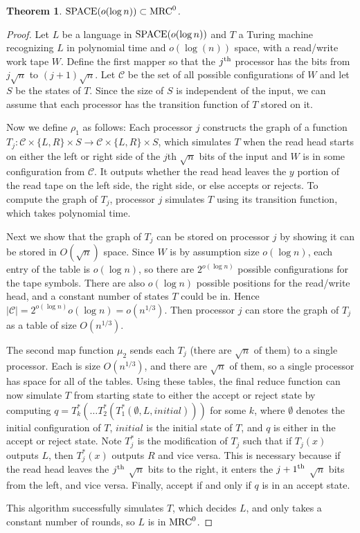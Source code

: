 \documentclass[11pt]{article}
\newtheorem{thm}{Theorem}
\theoremstyle{definition}
\theoremstyle{remark}
\newcommand{\mrc}{\textup{MRC}}
\begin{document}
\begin{thm} \label{thm:sublogspace}
$\textup{SPACE}(o(\log n))\subset \mrc^0$.
\end{thm}

\begin{proof}
Let $L$ be a language in $\textup{SPACE}(o(\log n))$ and $T$ a Turing machine
recognizing $L$ in polynomial time and $o(\log(n))$ space, with a read/write
work tape $W$.  Define the first mapper so that the $j^\textup{th}$ processor
has the bits from $j\sqrt{n}$ to $(j+1)\sqrt{n}$. Let $\mathcal{C}$ be the set
of all possible configurations of $W$ and let $S$ be the states of $T$.  Since
the size of $S$ is independent of the input, we can assume that each processor
has the transition function of $T$ stored on it.

Now we define $\rho_1$ as follows: Each processor $j$ constructs the graph of a
function $T_j:\mathcal{C} \times \{L,R\} \times S \rightarrow \mathcal{C}
\times \{L,R\} \times S$, which simulates $T$ when the read head starts on
either the left or right side of the $j$th $\sqrt{n}$ bits of the input and $W$
is in some configuration from $\mathcal{C}$.  It outputs whether the read head
leaves the $y$ portion of the read tape on the left side, the right side, or
else accepts or rejects.  To compute the graph of $T_j$, processor $j$
simulates $T$ using its transition function, which takes polynomial time.

Next we show that the graph of $T_j$ can be stored on processor $j$ by showing
it can be stored in $O(\sqrt{n})$ space.  Since $W$ is by assumption size
$o(\log n)$, each entry of the table is $o(\log n)$, so there are $2^{o(\log
n)}$ possible configurations for the tape symbols.  There are also $o(\log n)$
possible positions for the read/write head, and a constant number of states $T$
could be in. Hence $|\mathcal{C}| = 2^{o(\log n)} o(\log n) = o(n^{1/3})$.
Then processor $j$ can store the graph of $T_j$ as a table of size
$O(n^{1/3})$. 

The second map function $\mu_2$ sends each $T_j$ (there are $\sqrt{n}$ of them)
to a single processor.  Each is size $O(n^{1/3})$, and there are $\sqrt{n}$ of
them, so a single processor has space for all of the tables.  Using these
tables, the final reduce function can now simulate $T$ from starting state to
either the accept or reject state by computing $q=T_k^*(\ldots
T_2^*(T_1^*(\emptyset,L,initial)))$ for some $k$, where $\emptyset$ denotes the
initial configuration of $T$, $initial$ is the initial state of $T$, and $q$ is
either in the accept or reject state.  Note $T_j^*$ is the modification of
$T_j$ such that if $T_j(x)$ outputs $L$, then $T_j^*(x)$ outputs $R$ and vice
versa.  This is necessary because if the read head leaves the $j^\textup{th}$ $\sqrt{n}$
bits to the right, it enters the ${j+1}^\textup{th}$ $\sqrt{n}$ bits from the left, and
vice versa.  Finally, accept if and only if $q$ is in an accept state.

This algorithm successfully simulates $T$, which decides $L$, and only takes a
constant number of rounds, so $L$ is in $\mrc^0$.  \end{proof}
\end{document}
